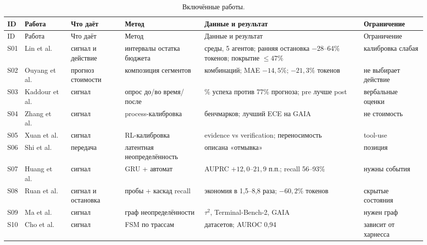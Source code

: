 \documentclass[11pt,a4paper]{article}
\begin{document}
{\scriptsize
\setlength{\tabcolsep}{3pt}
\renewcommand{\arraystretch}{1.12}
\begin{longtable}{@{}>{\raggedright\arraybackslash}p{0.65cm}>{\raggedright\arraybackslash}p{2.9cm}>{\raggedright\arraybackslash}p{2.15cm}>{\raggedright\arraybackslash}p{3.0cm}>{\raggedright\arraybackslash}p{3.6cm}>{\raggedright\arraybackslash}p{2.4cm}@{}}
\caption{Включённые работы.}\label{tab:sources}\\
\toprule
ID & Работа & Что даёт & Метод & Данные и результат & Ограничение \\
\midrule
\endfirsthead
\toprule
ID & Работа & Что даёт & Метод & Данные и результат & Ограничение \\
\midrule
\endhead
\bottomrule
\endfoot

S01 & Lin et al.~\cite{lin2026bagen} & сигнал и действие & интервалы остатка бюджета & 4 среды, 5 агентов; ранняя остановка −28--64\% токенов; покрытие $\le 47\%$ & калибровка слабая \\
S02 & Ouyang et al.~\cite{ouyang2026tokencast} & прогноз стоимости & композиция сегментов & 96 комбинаций; MAE $-14{,}5\%$; $-21{,}3\%$ токенов & не выбирает действие \\
S03 & Kaddour et al.~\cite{kaddour2026overconfidence} & сигнал & опрос до/во время/после & 22\% успеха против 77\% прогноза; pre лучше post & вербальные оценки \\
S04 & Zhang et al.~\cite{zhang2026htc} & сигнал & process-калибровка & 8 бенчмарков; лучший ECE на GAIA & не стоимость \\
S05 & Xuan et al.~\cite{xuan2026dichotomy} & сигнал & RL-калибровка & evidence vs verification; переносимость & tool-use \\
S06 & Shi et al.~\cite{shi2026laundering} & передача & латентная неопределённость & описана «отмывка» & позиция \\
S07 & Huang et al.~\cite{huang2026prefixguard} & сигнал & GRU + автомат & AUPRC $+12{,}0$--$21{,}9$ п.п.; recall 56--93\% & нужны события \\
S08 & Ruan et al.~\cite{ruan2026doomed} & сигнал и остановка & пробы + каскад recall & экономия в 1{,}5--8{,}8 раза; $-60{,}2\%$ токенов & скрытые состояния \\
S09 & Ma et al.~\cite{ma2026rupa} & сигнал & граф неопределённости & $\tau^2$, Terminal-Bench-2, GAIA & нужен граф \\
S10 & Cho et al.~\cite{cho2026automata} & сигнал & FSM по трассам & 12 датасетов; AUROC 0{,}94 & зависит от харнесса \\

\end{longtable}}
\end{document}
